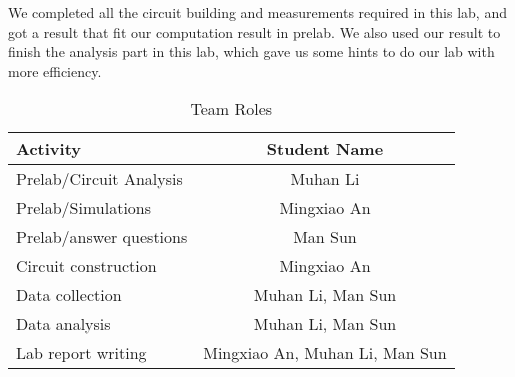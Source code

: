 \phantom{ } We completed all the circuit building and measurements required in this lab, and got a result that fit our computation result in prelab. We also used our result to finish the analysis part in this lab, which gave us some hints to do our lab with more efficiency. \\
\begin{table}[htbp]
	\caption{Team Roles}
	\renewcommand\arraystretch{1.5}\centering
	\begin{tabular}{l|c}
		\toprule
		Activity					&	Student Name 	\\
		\hline
		Prelab/Circuit Analysis		& 	Muhan Li		\\
		\hline
		Prelab/Simulations			&	Mingxiao An		\\
		\hline
		Prelab/answer questions		&	Man Sun			\\
		\hline
		Circuit construction		&	Mingxiao An		\\
		\hline
		Data collection				& Muhan Li, Man Sun	\\
		\hline
		Data analysis				& Muhan Li, Man Sun \\
		\hline
		Lab report writing			& Mingxiao An, Muhan Li, Man Sun \\
		\bottomrule
	\end{tabular}\\
\end{table}